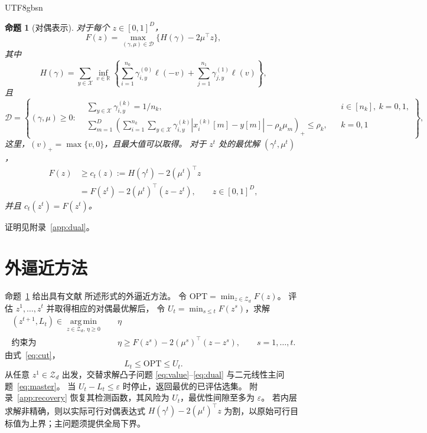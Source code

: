 \documentclass[11pt,a4paper]{article}
\theoremstyle{plain}
\newtheorem{proposition}{命题}[section]
\begin{document}
\begin{CJK*}{UTF8}{gbsn}
\begin{proposition}[对偶表示]\label{prop:dual}
对于每个 $z\in[0,1]^D$，
\begin{equation}\label{eq:dual}
F(z)=\max_{(\gamma,\mu)\in\mathcal D}
\{H(\gamma)-2\mu^\top z\},
\end{equation}
其中
\begin{equation}\label{eq:dual-loss}
H(\gamma)=\sum_{y\in\mathcal X}\inf_{v\in\mathbb R}
\left\{\sum_{i=1}^{n_0}\gamma_{i,y}^{(0)}\ell(-v)
+\sum_{j=1}^{n_1}\gamma_{j,y}^{(1)}\ell(v)\right\},
\end{equation}
且
\begin{equation}\label{eq:dual-domain}
\mathcal D=\left\{(\gamma,\mu)\ge0:
\begin{aligned}
&\sum_{y\in\mathcal X}\gamma_{i,y}^{(k)}=1/n_k,
&&i\in[n_k],\ k=0,1,\\
&\sum_{m=1}^D\left(
\sum_{i=1}^{n_k}\sum_{y\in\mathcal X}
\gamma_{i,y}^{(k)}|x_i^{(k)}[m]-y[m]|-\rho_k\mu_m
\right)_+\le\rho_k,
&&k=0,1
\end{aligned}\right\},
\end{equation}
这里，$(v)_+=\max\{v,0\}$，且最大值可以取得。
对于 $z^t$ 处的最优解 $(\gamma^t,\mu^t)$，
\begin{equation}\label{eq:cut}
\begin{aligned}
F(z)&\ge c_t(z):=H(\gamma^t)-2(\mu^t)^\top z\\
&=F(z^t)-2(\mu^t)^\top(z-z^t),\qquad z\in[0,1]^D,
\end{aligned}
\end{equation}
并且 $c_t(z^t)=F(z^t)$。
\end{proposition}
证明见附录~\ref{app:dual}。

\section{外逼近方法}\label{sec:algorithm}
命题~\ref{prop:dual} 给出具有文献
\cite[定理~2.5 与算法~3.1]{bertsimas2021unified} 所述形式的外逼近方法。
令 $\mathrm{OPT}=\min_{z\in\mathcal Z_d}F(z)$。
评估 $z^1,\ldots,z^t$ 并取得相应的对偶最优解后，
令 $U_t=\min_{s\le t}F(z^s)$，求解
\begin{equation}\label{eq:master}
\begin{aligned}
(z^{t+1},L_t)\in\operatorname*{arg\,min}_{z\in\mathcal Z_d,\,\eta\ge0}
\quad&\eta\\
\text{约束为}\quad&
\eta\ge F(z^s)-2(\mu^s)^\top(z-z^s),\qquad s=1,\ldots,t.
\end{aligned}
\end{equation}
由式~\eqref{eq:cut}，
\begin{equation}\label{eq:bounds}
L_t\le\mathrm{OPT}\le U_t.
\end{equation}
从任意 $z^1\in\mathcal Z_d$ 出发，交替求解凸子问题
\eqref{eq:value}--\eqref{eq:dual} 与二元线性主问题~\eqref{eq:master}。
当 $U_t-L_t\le\varepsilon$ 时停止，返回最优的已评估选集。
附录~\ref{app:recovery} 恢复其检测函数，其风险为 $U_t$，最优性间隙至多为 $\varepsilon$。
若内层求解非精确，则以实际可行对偶表达式
$H(\gamma^t)-2(\mu^t)^\top z$ 为割，以原始可行目标值为上界；主问题须提供全局下界。



\end{CJK*}
\end{document}
